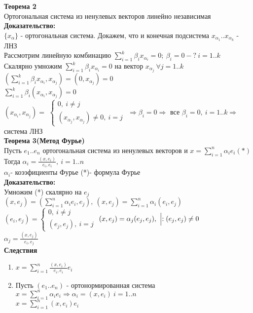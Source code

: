 \textbf{Теорема 2} \\
Ортогональная система из ненулевых векторов линейно независимая \\
\textbf{Доказательство: } \\
$\{ x_{\alpha} \}$ - ортогональная система. Докажем, что и конечная подсистема $x_{\alpha_1}..x_{\alpha_k}$ - ЛНЗ \\
Рассмотрим линейную комбинацию $\sum \limits_{i=1}^k {\beta_i x_{\alpha_i}}=0; \ \beta_i=0-? \ i=1..k$ \\
Скалярно умножим $\sum \limits_{i=1}^k {\beta_i x_{\alpha_i}}=0$ на вектор $x_{\alpha_j} \ \forall j=1..k$ \\
$\left( \sum \limits_{i=1}^k {\beta_i x_{\alpha_i}},x_{\alpha_j} \right)  =(0,x_{\alpha_j}) = 0$ \\
$\sum \limits_{i=1}^k {\beta_i (x_{\alpha_i},x_{\alpha_j})} = 0$ \\ 
$(x_{\alpha_i},x_{\alpha_j}) = $
$\left\{ \begin{matrix}
\mbox{$0, \ i \ne j $} \\
\mbox{$(x_{\alpha_j},x_{\alpha_j})\ne 0, \ i=j$}
\end{matrix}\right.$
$\Rightarrow \beta_i = 0 \Rightarrow$ все $\beta_i=0, \ i=1..k \Rightarrow$ система ЛНЗ \\
\textbf{Теорема 3(Метод Фурье)} \\
Пусть $e_1..e_n$ ортогональная система из ненулевых векторов и $x=\sum \limits_{i=1}^n {\alpha_i e_i} (*) $ \\
Тогда $\alpha_i= \frac{(x,e_i)}{e_i,e_i}, \ i=1..n$\\
$\alpha_i$- коээфициенты Фурье (*)- формула Фурье \\
\textbf{Доказательство: } \\
Умножим (*) скалярно на $e_j$ \\
$(x,e_j)=\left( \sum \limits_{i=1}^{n} {\alpha_i e_i},e_j \right), \ (x,e_j) = \sum \limits_{i=1}^n {\alpha_i (e_i,e_j)} $ \\
$(e_i,e_j)=\left\{ \begin{matrix}
\mbox{$0, \ i \ne j $} \\
\mbox{$(e_j,e_j), \ i=j$}
\end{matrix}\right.$
$(x,e_j)=\alpha_j(e_j,e_j), \ \Bigl| :(e_j,e_j) \ne 0 $ \\
$\alpha_j= \frac{(x,e_j)}{e_i,e_j}$ \\
\textbf{Следствия} \\
\begin{enumerate}
 \item $x=\sum \limits_{i=1}^n {\frac{(x,e_i)}{e_i,e_i} e_i}$
 \item Пусть $(e_1..e_n)$ - ортонормированная система $ x = \sum \limits_{i=1}^n {\alpha_i e_i} \Rightarrow \alpha_i = (x,e_i) \ i=1..n $ \\
       $x=\sum \limits_{i=1}^n {(x,e_i)e_i} $
\end{enumerate}
